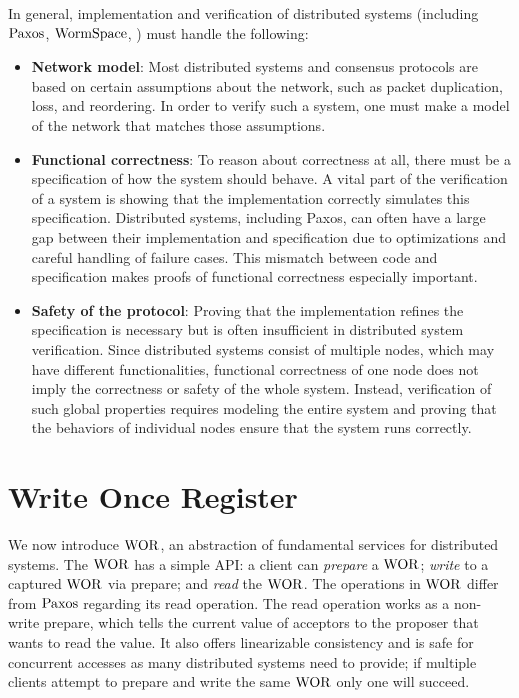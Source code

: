 In general, implementation and verification of distributed systems
(including $\mathrm{Paxos}$, $\mathrm{WormSpace}$, \etc) must handle the following:
\begin{itemize}

\item \textbf{Network model}:
Most distributed systems and consensus protocols are based on certain assumptions about the network,
such as packet duplication, loss, and reordering. In order to verify such a system, one must make a model of the network that matches
those assumptions.

\item \textbf{Functional correctness}: 
To reason about correctness at all, there must be a specification of how the system should behave.
A vital part of the verification of a system is showing that the implementation correctly simulates this specification.
Distributed systems, including Paxos, can often have a large gap between their implementation and specification due to optimizations and careful handling of failure cases.
This mismatch between code and specification makes proofs of functional correctness especially important.

\item \textbf{Safety of the protocol}: 
Proving that the implementation refines the specification is necessary but is often insufficient in distributed system verification.
Since distributed systems consist of multiple nodes, which may have different functionalities,
functional correctness of one node does not imply the correctness or safety of the whole system.
Instead, verification of such global properties requires modeling the entire system and
proving that the behaviors of individual nodes ensure that the system runs correctly.
\end{itemize}

\section{Write Once Register}
\label{chapter:wormspace:sec:write-once-register}

We now introduce $\mathrm{WOR}$, an abstraction of fundamental services for distributed systems. 
The $\mathrm{WOR}$ has a simple API: a client can \textit{prepare} a $\mathrm{WOR}$; \textit{write} to a captured $\mathrm{WOR}$ via prepare; and \textit{read} the  $\mathrm{WOR}$. 
The operations in $\mathrm{WOR}$ differ from $\mathrm{Paxos}$ regarding its read operation. 
The read operation works as a non-write prepare, which tells the current value of acceptors to the proposer that wants to read the value.
It also offers linearizable consistency and is safe for concurrent accesses as many distributed systems need to provide; 
if multiple clients attempt to prepare and write the same $\mathrm{WOR}$ only one will succeed.

